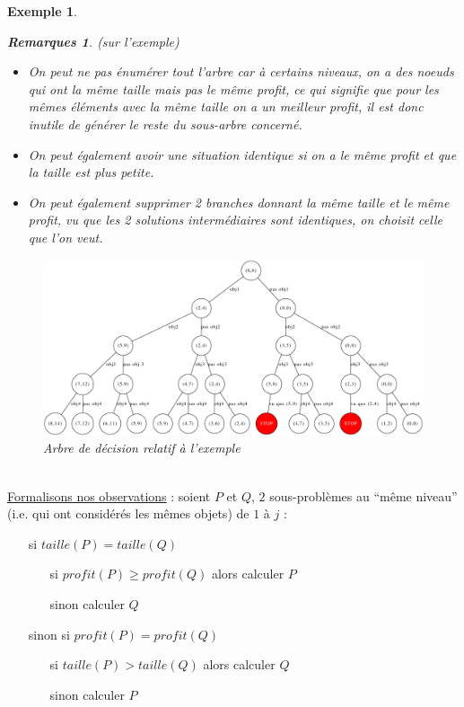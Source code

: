 \documentclass{article}
\newtheorem{exemple}{Exemple}[section]
\newtheorem{rems}{Remarques}[section]
\begin{document}
\begin{sffamily}
\begin{exemple}
\begin{rems}(sur l'exemple)
\begin{itemize}
\item On peut ne pas énumérer tout l'arbre car à certains niveaux, on a des noeuds qui ont la même taille mais pas le même profit, ce qui
signifie que pour les mêmes éléments avec la même taille on a un meilleur profit, il est donc inutile de générer le reste du sous-arbre
concerné.
\item On peut également avoir une situation identique si on a le même profit et que la taille est plus petite.
\item On peut également supprimer 2 branches donnant la même taille et le même profit, vu que les 2 solutions intermédiaires sont identiques,
on choisit celle que l'on veut.
\end{itemize}
\end{rems}

\begin{figure}[h!]
    \begin{center}
    \includegraphics[scale=0.4]{arbredec2.pdf}
    \caption{Arbre de décision relatif à l'exemple}
    \label{bigtree}
    \end{center}
\end{figure}
\end{exemple}
$ $\\

\noindent \underline{Formalisons nos observations} : soient $P$ et $Q$, $2$ sous-problèmes au ``même niveau''  \\ (i.e. qui ont considérés
les mêmes objets) de $1$ à $j$ :
\begin{itemize}
\item[si] $taille(P) = taille(Q)$
	\begin{itemize}
	\item[si] $profit(P) \geq profit(Q)$ alors calculer $P$
	\item[sinon] calculer $Q$
	\end{itemize}
\item[sinon si] $profit(P) = profit(Q)$
	\begin{itemize}
	\item[si] $taille(P) > taille (Q)$ alors calculer $Q$
	\item[sinon] calculer $P$ \\
	\end{itemize}
\end{itemize}


\end{sffamily}
\end{document}
